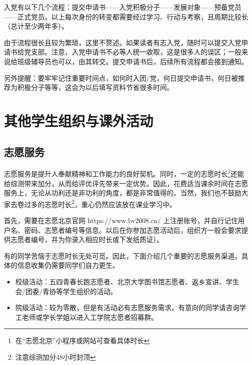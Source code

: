 \vspace{10pt}

入党有以下几个流程：提交申请书——入党积极分子——发展对象——预备党员——正式党员。以上每次身份的转变都需要经过学习、行动与考察，且周期比较长（总计至少两年多）。

\vspace{10pt}

由于流程很长且较为繁琐，这里不赘述。如果读者有志入党，随时可以提交入党申请书给党支部。注意，入党申请书不必等人统一收取，这是很多人的误区；一般来说给班级辅导员也可以，由其转交。提交申请书后，后续所有流程都会接到通知。

\vspace{10pt}

另外提醒：要牢牢记住重要时间点，如何时入团/党，何日提交申请书，何日被推荐为积极分子等等，这会为以后填写资料节省很多时间。

\section{其他学生组织与课外活动}
\subsection{志愿服务}

志愿服务是提升人奉献精神和工作能力的良好契机。同时，一定的志愿时长\footnote{在“志愿北京”小程序或网站可查看具体时长}还能给综测带来加分，从而给评优评先带来一定优势。因此，花费适当课余时间在志愿服务上，无论从功利还是非功利的角度，都是非常值得的。当然，我们也不鼓励大家去卷过多的志愿时长\footnote{注意综测加分48小时封顶}，重心仍然应该放在课业学习中。

\vspace{10pt}

首先，需要在志愿北京官网 https://www.bv2008.cn/ 上注册账号，并自行记住用户名、密码、志愿者编号等信息。以后在你参加志愿活动后，组织方一般会要求提供志愿者编号，并为你录入相应时长或下发纸质证）。

\vspace{10pt}

有的同学苦恼于志愿时长无处可觅。因此，下面介绍几个重要的志愿服务渠道。具体的信息收集仍需要同学们自力更生。
\begin{itemize}
	\item 校级活动：五四青春长跑志愿者、北京大学图书馆志愿者、返乡宣讲、学生会/团委/青协等学生组织的活动。
	\item 院级活动：较为零散，但是有活动必有志愿服务需求。有意向的同学请咨询学工老师或学长学姐以进入工学院志愿者招募群。
\end{itemize}

